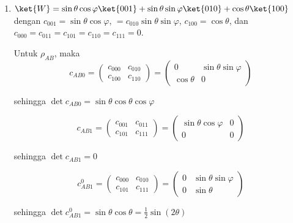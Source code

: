 \begin{enumerate}
	sehingga $\det c_{0BC}^1 = 0$.
	
	Maka
	\begin{equation}
		\mathrm{Tr}\,\rho_{BC}\tilde{\rho}_{BC}=\frac{4}{9}
	\end{equation}
	
	\item { $\ket{W}=\sin\theta\cos\varphi\ket{001}+\sin\theta\sin\varphi\ket{010}+\cos\theta\ket{100}$}
	dengan $c_{001}=\sin\theta\cos\varphi$, $=c_{010}\sin\theta\sin\varphi$, $c_{100}=\cos\theta$, dan $c_{000}=c_{011}=c_{101}=c_{110}=c_{111}=0$.
	
	Untuk $\rho_{AB}$, maka
	\begin{equation}
		c_{AB0}=
		\begin{pmatrix}
			c_{000} & c_{010} \\
			c_{100} & c_{110}
		\end{pmatrix}=
		\begin{pmatrix}
			0 & \sin\theta\sin\varphi \\
			\cos\theta & 0
		\end{pmatrix}
	\end{equation}
	
	sehingga $\det c_{AB0} = \sin\theta\cos\theta\cos\varphi$
	
	\begin{equation}
		c_{AB1}=
		\begin{pmatrix}
			c_{001} & c_{011} \\
			c_{101} & c_{111}
		\end{pmatrix}=
		\begin{pmatrix}
			\sin\theta\cos\varphi & 0 \\
			0 & 0
		\end{pmatrix}
	\end{equation}
	
	sehingga $\det c_{AB1} = 0$
	
	\begin{equation}
		c_{AB1}^0=
		\begin{pmatrix}
			c_{000} & c_{010} \\
			c_{101} & c_{111}
		\end{pmatrix}=
		\begin{pmatrix}
			0 & \sin\theta\sin\varphi \\
			0 & \sin\theta
		\end{pmatrix}
	\end{equation}
	
	sehingga $\det c_{AB1}^0 = \sin\theta \cos\theta = \frac{1}{2}\sin(2\theta)$
	

\end{enumerate}
